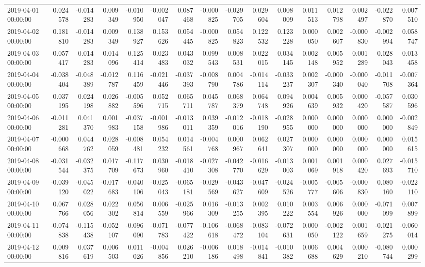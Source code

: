 \begin{tabular}{lrrrrrrrrrrrrrrr}
2019-04-01 00:00:00 & 0.024578 & -0.014283 & 0.009349 & -0.010950 & -0.002047 & 0.087468 & -0.000825 & -0.029705 & 0.029604 & 0.008009 & 0.011513 & 0.012798 & 0.002497 & -0.022870 & 0.007510 \\
2019-04-02 00:00:00 & 0.181810 & -0.014283 & 0.009349 & 0.138927 & 0.153626 & 0.054445 & -0.000825 & 0.054823 & 0.122532 & 0.123228 & 0.000050 & 0.002607 & -0.000830 & -0.002994 & 0.058747 \\
2019-04-03 00:00:00 & 0.057417 & -0.014283 & 0.014096 & 0.125414 & -0.023483 & -0.043032 & 0.099543 & -0.008531 & -0.022015 & -0.034145 & 0.002148 & 0.005952 & 0.001289 & 0.028043 & 0.013458 \\
2019-04-04 00:00:00 & -0.038404 & -0.048389 & -0.012787 & 0.116459 & -0.021446 & -0.037393 & -0.008790 & 0.004786 & -0.014114 & -0.033237 & 0.002307 & -0.000340 & -0.000040 & -0.011708 & -0.007364 \\
2019-04-05 00:00:00 & 0.037195 & 0.024198 & 0.026882 & -0.005596 & 0.052715 & 0.065711 & 0.045787 & 0.068379 & 0.064748 & 0.094926 & 0.004639 & 0.005932 & 0.000420 & -0.057587 & 0.030596 \\
2019-04-06 00:00:00 & -0.011281 & 0.041370 & 0.001983 & -0.037158 & -0.001986 & -0.013011 & 0.039359 & -0.012016 & -0.018190 & -0.028955 & 0.000000 & 0.000000 & 0.000000 & 0.000000 & -0.002849 \\
2019-04-07 00:00:00 & -0.000668 & 0.044762 & 0.028059 & -0.008481 & 0.054232 & 0.014561 & -0.004768 & 0.000967 & 0.062641 & 0.027307 & 0.000000 & 0.000000 & 0.000000 & 0.000000 & 0.015615 \\
2019-04-08 00:00:00 & -0.031544 & -0.032375 & 0.017709 & -0.117673 & 0.030960 & -0.018410 & -0.027308 & -0.042770 & -0.016629 & -0.013003 & 0.001069 & 0.001918 & 0.000420 & 0.027693 & -0.015710 \\
2019-04-09 00:00:00 & -0.039120 & -0.045022 & -0.017683 & -0.040106 & -0.025043 & -0.065181 & -0.029569 & -0.043627 & -0.047609 & -0.024526 & -0.005777 & -0.005606 & -0.000830 & 0.080160 & -0.022110 \\
2019-04-10 00:00:00 & 0.067766 & 0.028056 & 0.022302 & 0.056814 & 0.006559 & -0.025966 & 0.016309 & -0.013255 & 0.002395 & 0.010222 & 0.003554 & 0.006926 & 0.000000 & -0.071099 & 0.007899 \\
2019-04-11 00:00:00 & -0.074838 & -0.115438 & -0.052107 & -0.096090 & -0.071783 & -0.077422 & -0.106618 & -0.068472 & -0.083104 & -0.072631 & 0.000050 & -0.002122 & 0.001659 & -0.021275 & -0.060014 \\
2019-04-12 00:00:00 & 0.009816 & 0.037619 & 0.006503 & 0.011026 & -0.004856 & 0.026210 & -0.006186 & 0.018498 & -0.014841 & -0.010382 & 0.006688 & 0.004629 & 0.000210 & -0.080744 & 0.000299 \\

\end{tabular}
